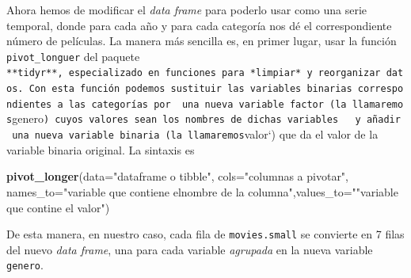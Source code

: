 \documentclass[
]{book}
\newenvironment{Shaded}{\begin{snugshade}}{\end{snugshade}}
\newcommand{\CommentTok}[1]{\textcolor[rgb]{0.56,0.35,0.01}{\textit{#1}}}
\newcommand{\DataTypeTok}[1]{\textcolor[rgb]{0.13,0.29,0.53}{#1}}
\newcommand{\KeywordTok}[1]{\textcolor[rgb]{0.13,0.29,0.53}{\textbf{#1}}}
\newcommand{\NormalTok}[1]{#1}
\newcommand{\OperatorTok}[1]{\textcolor[rgb]{0.81,0.36,0.00}{\textbf{#1}}}
\newcommand{\StringTok}[1]{\textcolor[rgb]{0.31,0.60,0.02}{#1}}
\theoremstyle{definition}
\theoremstyle{definition}
\theoremstyle{definition}
\theoremstyle{remark}
\begin{document}
Ahora hemos de modificar el \emph{data frame} para poderlo usar como una serie temporal, donde para cada año y para cada categoría nos dé el correspondiente número de películas. La manera más sencilla es, en primer lugar, usar la función \texttt{pivot\_longuer} del paquete \texttt{**tidyr**,\ especializado\ en\ funciones\ para\ *limpiar*\ y\ reorganizar\ datos.\ Con\ esta\ función\ podemos\ sustituir\ las\ variables\ binarias\ correspondientes\ a\ las\ categorías\ por\ \ una\ nueva\ variable\ factor\ (la\ llamaremos}genero\texttt{)\ cuyos\ valores\ sean\ los\ nombres\ de\ dichas\ variables\ \ \ y\ añadir\ una\ nueva\ variable\ binaria\ (la\ llamaremos}valor`) que da el valor de la variable binaria original.
La sintaxis es

\begin{Shaded}
\begin{Highlighting}[]
\KeywordTok{pivot\_longer}\NormalTok{(}\DataTypeTok{data=}\StringTok{"dataframe o tibble"}\NormalTok{, }\DataTypeTok{cols=}\StringTok{"columnas a pivotar"}\NormalTok{, }\DataTypeTok{names\_to=}\StringTok{"variable que contiene elnombre de la columna"}\NormalTok{,}\DataTypeTok{values\_to=}\StringTok{""}\NormalTok{variable que contine el valor}\StringTok{")}
\end{Highlighting}
\end{Shaded}

De esta manera, en nuestro caso, cada fila de \texttt{movies.small} se convierte en 7 filas del nuevo \emph{data frame}, una para cada variable \emph{agrupada} en la nueva variable \texttt{genero}.

\begin{Shaded}
\end{Shaded}
\end{document}
